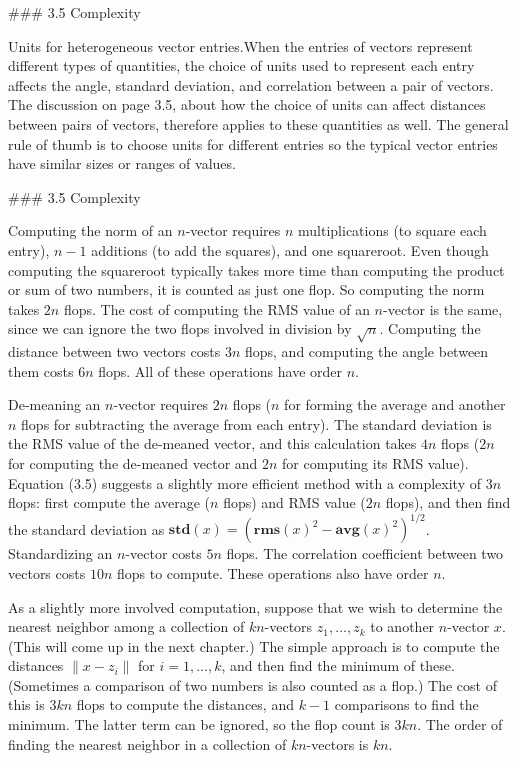 

### 3.5 Complexity

Units for heterogeneous vector entries.When the entries of vectors represent different types of quantities, the choice of units used to represent each entry affects the angle, standard deviation, and correlation between a pair of vectors. The discussion on page 3.5, about how the choice of units can affect distances between pairs of vectors, therefore applies to these quantities as well. The general rule of thumb is to choose units for different entries so the typical vector entries have similar sizes or ranges of values.

### 3.5 Complexity

Computing the norm of an \(n\)-vector requires \(n\) multiplications (to square each entry), \(n-1\) additions (to add the squares), and one squareroot. Even though computing the squareroot typically takes more time than computing the product or sum of two numbers, it is counted as just one flop. So computing the norm takes \(2n\) flops. The cost of computing the RMS value of an \(n\)-vector is the same, since we can ignore the two flops involved in division by \(\sqrt{n}\). Computing the distance between two vectors costs \(3n\) flops, and computing the angle between them costs \(6n\) flops. All of these operations have order \(n\).

De-meaning an \(n\)-vector requires \(2n\) flops (\(n\) for forming the average and another \(n\) flops for subtracting the average from each entry). The standard deviation is the RMS value of the de-meaned vector, and this calculation takes \(4n\) flops (\(2n\) for computing the de-meaned vector and \(2n\) for computing its RMS value). Equation (3.5) suggests a slightly more efficient method with a complexity of \(3n\) flops: first compute the average (\(n\) flops) and RMS value (\(2n\) flops), and then find the standard deviation as \(\mathbf{std}(x)=(\mathbf{rms}(x)^{2}-\mathbf{avg}(x)^{2})^{1/2}\). Standardizing an \(n\)-vector costs \(5n\) flops. The correlation coefficient between two vectors costs \(10n\) flops to compute. These operations also have order \(n\).

As a slightly more involved computation, suppose that we wish to determine the nearest neighbor among a collection of \(k\)\(n\)-vectors \(z_{1},\ldots,z_{k}\) to another \(n\)-vector \(x\). (This will come up in the next chapter.) The simple approach is to compute the distances \(\|x-z_{i}\|\) for \(i=1,\ldots,k\), and then find the minimum of these. (Sometimes a comparison of two numbers is also counted as a flop.) The cost of this is \(3kn\) flops to compute the distances, and \(k-1\) comparisons to find the minimum. The latter term can be ignored, so the flop count is \(3kn\). The order of finding the nearest neighbor in a collection of \(k\)\(n\)-vectors is \(kn\).

